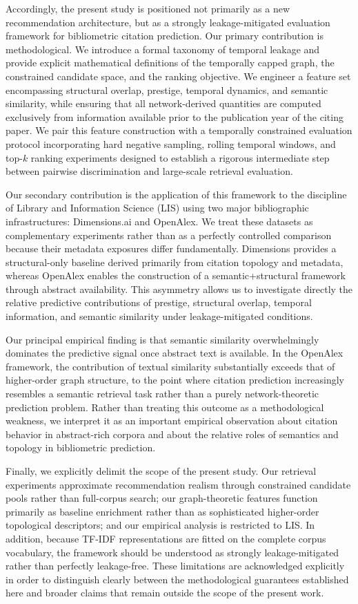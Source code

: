 \documentclass[11pt,a4paper]{article}
\begin{document}
Accordingly, the present study is positioned not primarily as a new recommendation architecture, but as a strongly leakage-mitigated evaluation framework for bibliometric citation prediction. Our primary contribution is methodological. We introduce a formal taxonomy of temporal leakage and provide explicit mathematical definitions of the temporally capped graph, the constrained candidate space, and the ranking objective. We engineer a feature set encompassing structural overlap, prestige, temporal dynamics, and semantic similarity, while ensuring that all network-derived quantities are computed exclusively from information available prior to the publication year of the citing paper. We pair this feature construction with a temporally constrained evaluation protocol incorporating hard negative sampling, rolling temporal windows, and top-$k$ ranking experiments designed to establish a rigorous intermediate step between pairwise discrimination and large-scale retrieval evaluation.

Our secondary contribution is the application of this framework to the discipline of Library and Information Science (LIS) using two major bibliographic infrastructures: Dimensions.ai and OpenAlex. We treat these datasets as complementary experiments rather than as a perfectly controlled comparison because their metadata exposures differ fundamentally. Dimensions provides a structural-only baseline derived primarily from citation topology and metadata, whereas OpenAlex enables the construction of a semantic+structural framework through abstract availability. This asymmetry allows us to investigate directly the relative predictive contributions of prestige, structural overlap, temporal information, and semantic similarity under leakage-mitigated conditions.

Our principal empirical finding is that semantic similarity overwhelmingly dominates the predictive signal once abstract text is available. In the OpenAlex framework, the contribution of textual similarity substantially exceeds that of higher-order graph structure, to the point where citation prediction increasingly resembles a semantic retrieval task rather than a purely network-theoretic prediction problem. Rather than treating this outcome as a methodological weakness, we interpret it as an important empirical observation about citation behavior in abstract-rich corpora and about the relative roles of semantics and topology in bibliometric prediction.

Finally, we explicitly delimit the scope of the present study. Our retrieval experiments approximate recommendation realism through constrained candidate pools rather than full-corpus search; our graph-theoretic features function primarily as baseline enrichment rather than as sophisticated higher-order topological descriptors; and our empirical analysis is restricted to LIS. In addition, because TF-IDF representations are fitted on the complete corpus vocabulary, the framework should be understood as strongly leakage-mitigated rather than perfectly leakage-free. These limitations are acknowledged explicitly in order to distinguish clearly between the methodological guarantees established here and broader claims that remain outside the scope of the present work.
\end{document}
